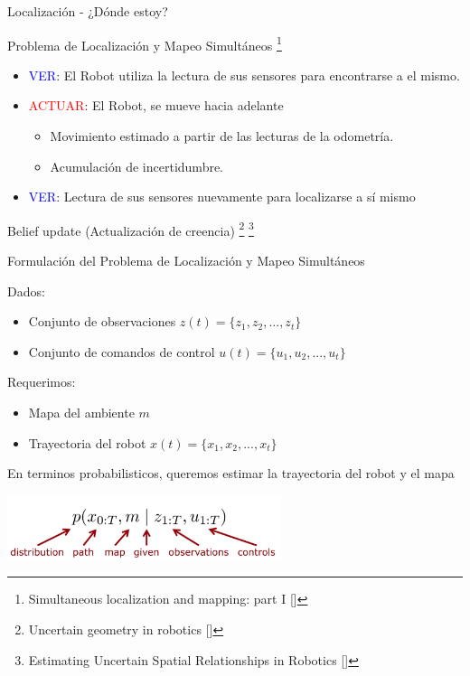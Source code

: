 \documentclass[
  24pt, %
  aspectratio=169, %
]{beamer}
\begin{document}
\begin{frame}{Localización - ¿Dónde estoy?}

  Problema de Localización y Mapeo Simultáneos  \footnote{Simultaneous localization and mapping: part I [\cite{slam_doc}]}
  \bigskip %
  \begin{itemize} 
    \item \textcolor{blue}{VER}: El Robot utiliza la lectura de sus sensores para encontrarse a el mismo.
      \bigskip %
    \item \textcolor{red}{ACTUAR}: El Robot, se mueve hacia adelante
      \begin{itemize}
      \item Movimiento estimado a partir de las lecturas de la odometría.
      \item Acumulación de incertidumbre.
      \end{itemize}
      \bigskip %
    \item \textcolor{blue}{VER}: Lectura de sus sensores nuevamente para localizarse a sí mismo
  \end{itemize}
      
  \bigskip %
  Belief update (Actualización de creencia) \footnote{Uncertain geometry in robotics [\cite{slam_dur}]} \footnote{Estimating Uncertain Spatial Relationships in Robotics [\cite{Smith1988}]}
  
\end{frame}

\begin{frame}{Formulación del Problema de Localización y Mapeo Simultáneos}

  Dados:
  \begin{itemize}
  \item Conjunto de observaciones $z(t) = \{z_1,z_2,...,z_t\}$
  \item Conjunto de comandos de control $u(t) = \{u_1,u_2,...,u_t\}$
  \end{itemize}
  \bigskip %
  Requerimos:
  \begin{itemize}
  \item Mapa del ambiente $m$
  \item Trayectoria del robot $x(t) = \{x_1,x_2,...,x_t\}$
  \end{itemize}
  \bigskip %
  
  En terminos probabilisticos, queremos estimar la trayectoria del robot y el mapa

  \centering
  \includegraphics[width=8cm]{slam1}
  
\end{frame}
\end{document}
